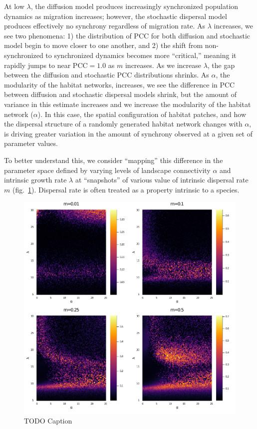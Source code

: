 \documentclass[10pt,oneside]{article}
\makeatletter
\def\maxwidth{\ifdim\Gin@nat@width>\linewidth\linewidth
\else\Gin@nat@width\fi}
\let\Oldincludegraphics\includegraphics
\renewcommand{\includegraphics}[1]{\Oldincludegraphics[width=\maxwidth]{#1}}
\makeatother
\begin{document}
At low \(\lambda\), the diffusion model produces increasingly
synchronized population dynamics as migration increases; however, the
stochastic dispersal model produces effectively no synchrony regardless
of migration rate. As \(\lambda\) increases, we see two phenomena: 1)
the distribution of \(\text{PCC}\) for both diffusion and stochastic
model begin to move closer to one another, and 2) the shift from
non-synchronized to synchronized dynamics becomes more ``critical,''
meaning it rapidly jumps to near \(\text{PCC}=1.0\) as \(m\) increases.
As we increase \(\lambda\), the gap between the diffusion and stochastic
PCC distributions shrinks. As \(\alpha\), the modularity of the habitat
networks, increases, we see the difference in PCC between diffusion and
stochastic dispersal models shrink, but the amount of variance in this
estimate increases and we increase the modularity of the habitat network
(\(\alpha\)). In this case, the spatial configuration of habitat
patches, and how the dispersal structure of a randomly generated habitat
network changes with \(\alpha\), is driving greater variation in the
amount of synchrony observed at a given set of parameter values.

To better understand this, we consider ``mapping'' this difference in
the parameter space defined by varying levels of landscape connectivity
\(\alpha\) and intrinsic growth rate \(\lambda\) at ``snapshots'' of
various value of intrinsic dispersal rate \(m\)
(fig.~\ref{fig:lattice}). Dispersal rate is often treated as a property
intrinsic to a species.

\begin{figure}
\hypertarget{fig:lattice}{%
\centering
\includegraphics{./figures/connectivity_demography_lattice.png}
\caption{TODO Caption}\label{fig:lattice}
}
\end{figure}
\end{document}
